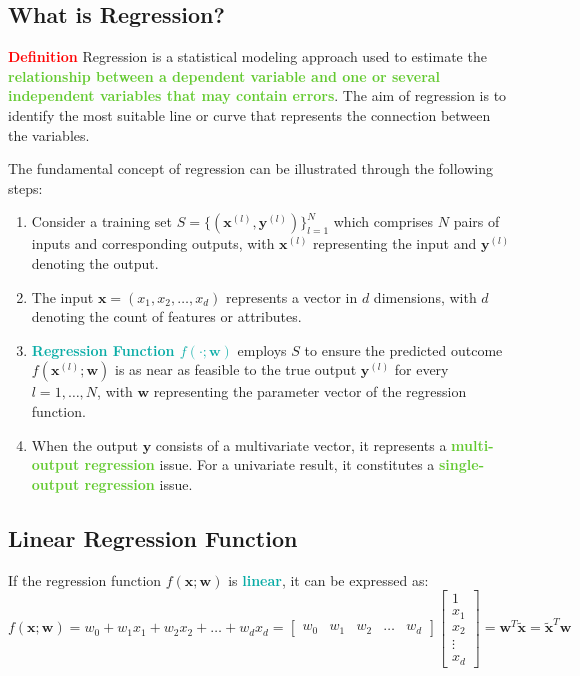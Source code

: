 \documentclass[twoside]{article}
\newcommand{\definition}[1]{\begin{definitionbox} \textcolor{red}{{\scriptsize\faStar} \textbf{Definition}} \newline #1 \end{definitionbox}}
\newcommand{\highlightbluetext}[1]{\textcolor[HTML]{09ACA6}{\textbf{#1}}}
\newcommand{\highlightgreentext}[1]{\textcolor[HTML]{62C92F}{\textbf{#1}}}
\numberwithin{equation}{section}
\begin{document}
	\subsection{What is Regression?}
	\label{subsec:WhatIsRegression}

	\definition{Regression is a statistical modeling approach used to estimate the \highlightgreentext{relationship between a dependent variable and one or several independent variables that may contain errors}. The aim of regression is to identify the most suitable line or curve that represents the connection between the variables.}

	The fundamental concept of regression can be illustrated through the following steps: 
	\begin{enumerate}
		\item Consider a training set $S = \{(\mathbf{x}^{(l)}, \mathbf{y}^{(l)})\}_{l=1}^N$ which comprises $N$ pairs of inputs and corresponding outputs, with $\mathbf{x}^{(l)}$ representing the input and $\mathbf{y}^{(l)}$ denoting the output. 
		\item The input $\mathbf{x} = (x_1, x_2, \ldots, x_d)$ represents a vector in $d$ dimensions, with $d$ denoting the count of features or attributes. 
		\item \highlightbluetext{Regression Function $f(\cdot ; \mathbf{w})$} employs $S$ to ensure the predicted outcome $f(\mathbf{x}^{(l)} ; \mathbf{w})$ is as near as feasible to the true output $\mathbf{y}^{(l)}$ for every $l = 1, \ldots, N$, with $\mathbf{w}$ representing the parameter vector of the regression function. 
		\item When the output $\mathbf{y}$ consists of a multivariate vector, it represents a \highlightgreentext{multi-output regression} issue. For a univariate result, it constitutes a \highlightgreentext{single-output regression} issue. 
	\end{enumerate}

	\subsection{Linear Regression Function}
	\label{subsec:LinearRegressionFunction}
	If the regression function $f(\mathbf{x} ; \mathbf{w})$ is \highlightbluetext{linear}, it can be expressed as:
	\begin{equation}
	\label{eq:LinearRegressionFunction}
	\boxed{f(\mathbf{x} ; \mathbf{w}) = w_0 + w_1 x_1 + w_2 x_2 + \ldots + w_d x_d = \begin{bmatrix} w_0 & w_1 & w_2 & \ldots & w_d \end{bmatrix} \begin{bmatrix} 1 \\ x_1 \\ x_2 \\ \vdots \\ x_d \end{bmatrix} = \mathbf{w}^T \mathbf{\tilde{x}} = \mathbf{\tilde{x}}^T \mathbf{w}}
	\end{equation}
	
\end{document}
